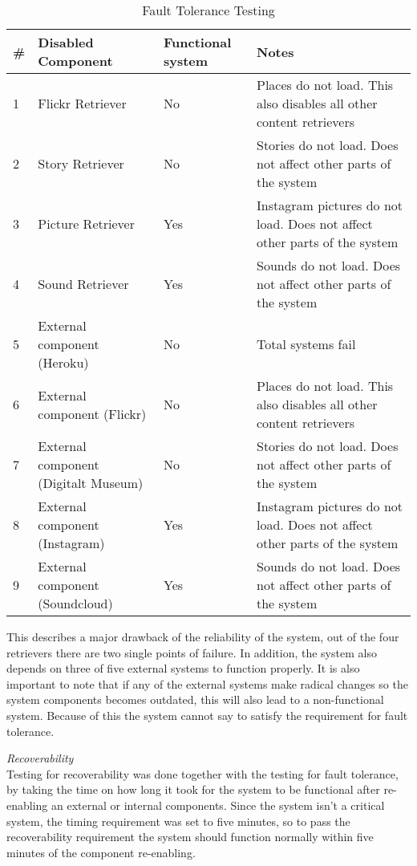 \begin{table}[!htp]
\begin{center}
	\begin{tabular}{ | l | p{4.2cm} | l | p{6.5cm} | }
	\hline
	\#	&Disabled Component	&Functional system	& Notes \\ \hline
	1	&Flickr Retriever		&No			& Places do not load. This also disables all other content retrievers\\ \hline
	2	&Story Retriever		&No			& Stories do not load. Does not affect other parts of the system\\ \hline
	3	&Picture Retriever	&Yes			& Instagram pictures do not load. Does not affect other parts of the system\\ \hline
	4	&Sound Retriever	&Yes			& Sounds do not load. Does not affect other parts of the system\\ \hline
	5	&External component (Heroku)	&No			& Total systems fail\\ \hline
	6	&External component (Flickr)	&No			& Places do not load. This also disables all other content retrievers\\ \hline
	7	&External component (Digitalt Museum)	&No		& Stories do not load. Does not affect other parts of the system\\ \hline
	8	&External component (Instagram)	&Yes			& Instagram pictures do not load. Does not affect other parts of the system\\ \hline
	9	&External component (Soundcloud)	&Yes			& Sounds do not load. Does not affect other parts of the system\\ 
	 \hline
	 \end{tabular}
\end{center}
\caption{Fault Tolerance Testing}
\label{tab:Fault Tolerance Testing}
\end{table}

This describes a major drawback of the reliability of the system, out of the four retrievers there are two single points of failure. In addition, the system also depends on three of five external systems to function properly. It is also important to note that if any of the external systems make radical changes so the system components becomes outdated, this will also lead to a non-functional system. Because of this the system cannot say to satisfy the requirement for fault tolerance.

\emph{Recoverability}\\

Testing for recoverability was done together with the testing for fault tolerance, by taking the time on how long it took for the system to be functional after re-enabling an external or internal components. Since the system isn't a critical system, the timing requirement was set to five minutes, so to pass the recoverability requirement the system should function normally within five minutes of the component re-enabling. 

